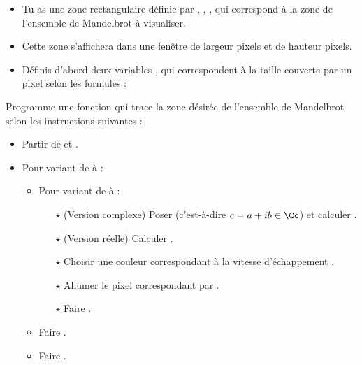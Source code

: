 \documentclass[11pt,class=report,crop=false]{standalone}
\begin{document}
\begin{activite}


\begin{itemize}
  \item Tu as une zone rectangulaire définie par , , ,  qui correspond à la zone de l'ensemble de Mandelbrot à visualiser.

  \item Cette zone s'affichera dans une fenêtre de largeur  pixels et de hauteur  pixels.

  \item Définis d'abord deux variables ,  qui correspondent à la taille couverte par un pixel selon les formules :
 \end{itemize} 
 
 \bigskip
 
  
Programme une fonction  qui trace la zone désirée de l'ensemble de Mandelbrot selon les instructions suivantes :

\begin{itemize}
  \item Partir de  et . 
  \item Pour  variant de  à  :
  \begin{itemize}
    \item Pour  variant de  à  :
    
    \begin{itemize}
    \item[$\star$] (Version complexe) Poser  (c'est-à-dire $c=a + i b \in \Cc$) et calculer .
    \item[$\star$] (Version réelle) Calculer . 
  	\item[$\star$] Choisir une  couleur correspondant à la vitesse d'échappement .
  	\item[$\star$] Allumer le pixel correspondant par .
 	\item[$\star$] Faire .
  	\end{itemize}
  	
  	\item Faire .
  	\item Faire .
  \end{itemize}
\end{itemize} 


\bigskip 


\end{activite}
\end{document}
